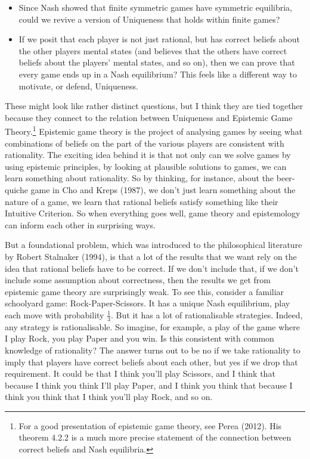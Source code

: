 \documentclass[12pt,]{article}
\providecommand{\tightlist}{%
  \setlength{\itemsep}{0pt}\setlength{\parskip}{0pt}}
\let\rmarkdownfootnote\footnote%
\def\footnote{\protect\rmarkdownfootnote}
\begin{document}
\begin{itemize}
\tightlist
\item
  Since Nash showed that finite symmetric games have symmetric equilibria, could we revive a version of Uniqueness that holds within finite games?
\item
  If we posit that each player is not just rational, but has correct beliefs about the other players mental states (and believes that the others have correct beliefs about the players' mental states, and so on), then we can prove that every game ends up in a Nash equilibrium? This feels like a different way to motivate, or defend, Uniqueness.
\end{itemize}

These might look like rather distinct questions, but I think they are tied together because they connect to the relation between Uniqueness and Epistemic Game Theory.\footnote{For a good presentation of epistemic game theory, see Perea (2012). His theorem 4.2.2 is a much more precise statement of the connection between correct beliefs and Nash equilibria.} Epistemic game theory is the project of analysing games by seeing what combinations of beliefs on the part of the various players are consistent with rationality. The exciting idea behind it is that not only can we solve games by using epistemic principles, by looking at plausible solutions to games, we can learn something about rationality. So by thinking, for instance, about the beer-quiche game in Cho and Kreps (1987), we don't just learn something about the nature of a game, we learn that rational beliefs satisfy something like their Intuitive Criterion. So when everything goes well, game theory and epistemology can inform each other in surprising ways.

But a foundational problem, which was introduced to the philosophical literature by Robert Stalnaker (1994), is that a lot of the results that we want rely on the idea that rational beliefs have to be correct. If we don't include that, if we don't include some assumption about correctness, then the results we get from epistemic game theory are surprisingly weak. To see this, consider a familiar schoolyard game: Rock-Paper-Scissors. It has a unique Nash equilibrium, play each move with probability \(\frac{1}{3}\). But it has a lot of rationalisable strategies. Indeed, any strategy is rationalisable. So imagine, for example, a play of the game where I play Rock, you play Paper and you win. Is this consistent with common knowledge of rationality? The answer turns out to be no if we take rationality to imply that players have correct beliefs about each other, but yes if we drop that requirement. It could be that I think you'll play Scissors, and I think that because I think you think I'll play Paper, and I think you think that because I think you think that I think you'll play Rock, and so on.
\end{document}
